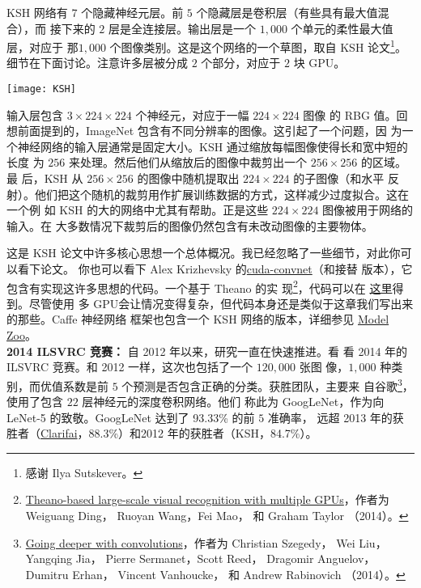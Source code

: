 KSH 网络有 $7$ 个隐藏神经元层。前 $5$ 个隐藏层是卷积层（有些具有最大值混合），而
接下来的 $2$ 层是全连接层。输出层是一个 $1,000$ 个单元的柔性最大值层，对应于
那$1,000$ 个图像类别。这是这个网络的一个草图，取自 KSH 论文\footnote{感谢 Ilya
  Sutskever。}。细节在下面讨论。注意许多层被分成 $2$ 个部分，对应于 $2$ 块 GPU。
\begin{center}
\texttt{[image: KSH]}
\end{center}

输入层包含 $3 \times 224 \times 224$ 个神经元，对应于一幅 $224 \times 224$ 图像
的 RBG 值。回想前面提到的，ImageNet 包含有不同分辨率的图像。这引起了一个问题，因
为一个神经网络的输入层通常是固定大小。KSH 通过缩放每幅图像使得长和宽中短的长度
为 $256$ 来处理。然后他们从缩放后的图像中裁剪出一个 $256 \times 256$ 的区域。最
后，KSH 从 $256 \times 256$ 的图像中随机提取出 $224 \times 224$ 的子图像（和水平
反射）。他们把这个随机的裁剪用作扩展训练数据的方式，这样减少过度拟合。这在一个例
如 KSH 的大的网络中尤其有帮助。正是这些 $224 \times 224$ 图像被用于网络的输入。在
大多数情况下裁剪后的图像仍然包含有未改动图像的主要物体。

这是 KSH 论文中许多核心思想一个总体概况。我已经忽略了一些细节，对此你可以看下论文。
你也可以看下 Alex
Krizhevsky 的\href{https://code.google.com/p/cuda-convnet/}{cuda-convnet}（和接替
版本），它包含有实现这许多思想的代码。一个基于 Theano 的实
现\footnote{\href{http://arxiv.org/abs/1412.2302}{Theano-based large-scale
    visual recognition with multiple GPUs}，作者为 Weiguang Ding， Ruoyan
  Wang，Fei Mao， 和 Graham Taylor （2014）。}，代码可以在%
\href{https://github.com/uoguelph-mlrg/theano_alexnet}{这里}得到。尽管使用
多 GPU会让情况变得复杂，但代码本身还是类似于这章我们写出来的那些。Caffe 神经网络
框架也包含一个 KSH 网络的版本，详细参见
\href{http://caffe.berkeleyvision.org/model_zoo.html}{Model Zoo}。\\

\textbf{2014 ILSVRC 竞赛：} 自 2012 年以来，研究一直在快速推进。看
看 2014 年的ILSVRC 竞赛。和 2012 一样，这次也包括了一个 $120,000$ 张图
像，$1,000$ 种类别，而优值系数是前 $5$ 个预测是否包含正确的分类。获胜团队，主要来
自谷歌\footnote{\href{http://arxiv.org/abs/1409.4842}{Going deeper with
    convolutions}，作者为 Christian Szegedy， Wei Liu， Yangqing Jia， Pierre
  Sermanet，Scott Reed， Dragomir Anguelov， Dumitru Erhan， Vincent Vanhoucke，
  和 Andrew Rabinovich （2014）。}，使用了包含 $22$ 层神经元的深度卷积网络。他们
称此为 GoogLeNet，作为向 LeNet-5 的致敬。GoogLeNet 达到了 93.33\% 的前 $5$ 准确率，
远超 2013 年的获胜者（\href{http://www.clarifai.com/}{Clarifai}，88.3\%）和2012
年的获胜者（KSH，84.7\%）。

